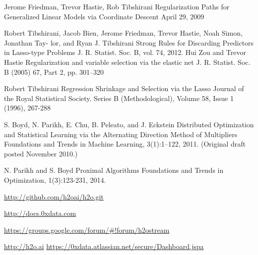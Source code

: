 \documentclass[11pt]{article}
\begin{document}
\begin{thebibliography}{9}

Jerome Friedman, Trevor Hastie, Rob Tibshirani
Regularization Paths for Generalized Linear Models via Coordinate Descent
April 29, 2009

  Robert Tibshirani, Jacob Bien, Jerome Friedman, Trevor Hastie, Noah Simon, Jonathan Tay- lor, and Ryan J. Tibshirani
  Strong Rules for Discarding Predictors in Lasso-type Problems
  J. R. Statist. Soc. B, vol. 74, 
  2012.
Hui Zou and Trevor Hastie
Regularization and variable selection via the elastic net
J. R. Statist. Soc. B (2005) 67, Part 2, pp. 301–320

Robert Tibshirani
Regression Shrinkage and Selection via the Lasso
Journal of the Royal Statistical Society. Series B (Methodological), Volume 58, Issue 1 (1996), 267-288

S. Boyd, N. Parikh, E. Chu, B. Peleato, and J. Eckstein
Distributed Optimization and Statistical Learning via the Alternating Direction Method of Multipliers
Foundations and Trends in Machine Learning, 3(1):1–122, 2011. (Original draft posted November 2010.)

N. Parikh and S. Boyd
Proximal Algorithms
Foundations and Trends in Optimization, 1(3):123-231, 2014.

\url{http://github.com/h2oai/h2o.git}

\url{http://docs.0xdata.com}

\url{https://groups.google.com/forum/#!forum/h2ostream}

\url{http://h2o.ai}
\url{https://0xdata.atlassian.net/secure/Dashboard.jspa}
\end{thebibliography}

\end{document}
